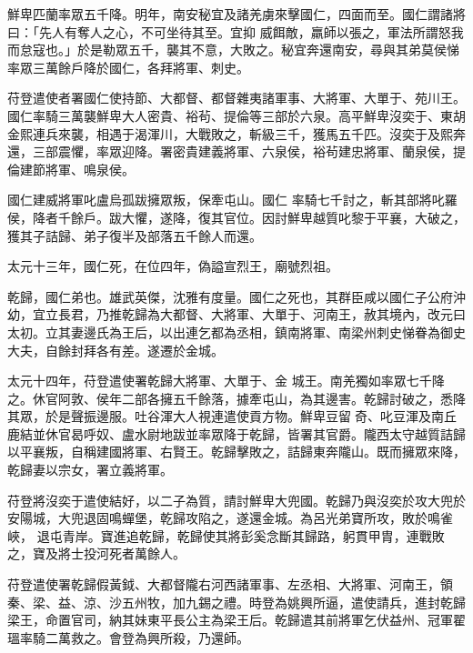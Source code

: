 \begin{pinyinscope}
 鮮卑匹蘭率眾五千降。明年，南安秘宜及諸羌虜來擊國仁，四面而至。國仁謂諸將曰：「先人有奪人之心，不可坐待其至。宜抑
 威餌敵，羸師以張之，軍法所謂怒我而怠寇也。」於是勒眾五千，襲其不意，大敗之。秘宜奔還南安，尋與其弟莫侯悌率眾三萬餘戶降於國仁，各拜將軍、刺史。



 苻登遣使者署國仁使持節、大都督、都督雜夷諸軍事、大將軍、大單于、苑川王。國仁率騎三萬襲鮮卑大人密貴、裕茍、提倫等三部於六泉。高平鮮卑沒奕于、東胡金熙連兵來襲，相遇于渴渾川，大戰敗之，斬級三千，獲馬五千匹。沒奕于及熙奔還，三部震懼，率眾迎降。署密貴建義將軍、六泉侯，裕茍建忠將軍、蘭泉侯，提倫建節將軍、鳴泉侯。



 國仁建威將軍叱盧烏孤跋擁眾叛，保牽屯山。國仁
 率騎七千討之，斬其部將叱羅侯，降者千餘戶。跋大懼，遂降，復其官位。因討鮮卑越質叱黎于平襄，大破之，獲其子詰歸、弟子復半及部落五千餘人而還。



 太元十三年，國仁死，在位四年，偽謚宣烈王，廟號烈祖。



 乾歸，國仁弟也。雄武英傑，沈雅有度量。國仁之死也，其群臣咸以國仁子公府沖幼，宜立長君，乃推乾歸為大都督、大將軍、大單于、河南王，赦其境內，改元曰太初。立其妻邊氏為王后，以出連乞都為丞相，鎮南將軍、南梁州刺史悌眷為御史大夫，自餘封拜各有差。遂遷於金城。



 太元十四年，苻登遣使署乾歸大將軍、大單于、金
 城王。南羌獨如率眾七千降之。休官阿敦、侯年二部各擁五千餘落，據牽屯山，為其邊害。乾歸討破之，悉降其眾，於是聲振邊服。吐谷渾大人視連遣使貢方物。鮮卑豆留奇、叱豆渾及南丘鹿結並休官曷呼奴、盧水尉地跋並率眾降于乾歸，皆署其官爵。隴西太守越質詰歸以平襄叛，自稱建國將軍、右賢王。乾歸擊敗之，詰歸東奔隴山。既而擁眾來降，乾歸妻以宗女，署立義將軍。



 苻登將沒奕于遣使結好，以二子為質，請討鮮卑大兜國。乾歸乃與沒奕於攻大兜於安陽城，大兜退固鳴蟬堡，乾歸攻陷之，遂還金城。為呂光弟寶所攻，敗於鳴雀峽，
 退屯青岸。寶進追乾歸，乾歸使其將彭奚念斷其歸路，躬貫甲胄，連戰敗之，寶及將士投河死者萬餘人。



 苻登遣使署乾歸假黃鉞、大都督隴右河西諸軍事、左丞相、大將軍、河南王，領秦、梁、益、涼、沙五州牧，加九錫之禮。時登為姚興所逼，遣使請兵，進封乾歸梁王，命置官司，納其妹東平長公主為梁王后。乾歸遣其前將軍乞伏益州、冠軍翟瑥率騎二萬救之。會登為興所殺，乃還師。




\end{pinyinscope}
